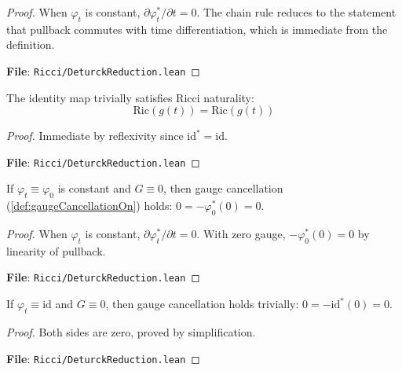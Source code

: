 \begin{proof}
\leanok
When $\varphi_t$ is constant, $\partial \varphi_t^*/\partial t = 0$. The chain rule reduces to the statement that pullback commutes with time differentiation, which is immediate from the definition.

\textbf{File}: \texttt{Ricci/DeturckReduction.lean}
\end{proof}

\begin{lemma}
\label{lem:ricciNaturalityOn_id}
\leanok
{}
The identity map trivially satisfies Ricci naturality:
\[ \mathrm{Ric}(g(t)) = \mathrm{Ric}(g(t)) \]
\end{lemma}

\begin{proof}
\leanok
Immediate by reflexivity since $\mathrm{id}^* = \mathrm{id}$.

\textbf{File}: \texttt{Ricci/DeturckReduction.lean}
\end{proof}

\begin{lemma}
\label{lem:gaugeCancellationOn_zero_constφ}
\leanok
{}
If $\varphi_t \equiv \varphi_0$ is constant and $G \equiv 0$, then gauge cancellation (\ref{def:gaugeCancellationOn}) holds: $0 = -\varphi_0^*(0) = 0$.
\end{lemma}

\begin{proof}
\leanok
When $\varphi_t$ is constant, $\partial \varphi_t^*/\partial t = 0$. With zero gauge, $-\varphi_0^*(0) = 0$ by linearity of pullback.

\textbf{File}: \texttt{Ricci/DeturckReduction.lean}
\end{proof}

\begin{lemma}
\label{lem:gaugeCancellationOn_id_zero}
\leanok
{}
If $\varphi_t \equiv \mathrm{id}$ and $G \equiv 0$, then gauge cancellation holds trivially: $0 = -\mathrm{id}^*(0) = 0$.
\end{lemma}

\begin{proof}
\leanok
Both sides are zero, proved by simplification.

\textbf{File}: \texttt{Ricci/DeturckReduction.lean}
\end{proof}


